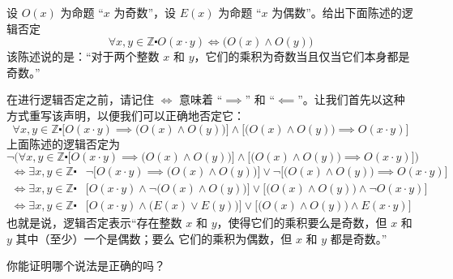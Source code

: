 \begin{example}
    设 $O(x)$ 为命题 ``$x$ 为奇数''，设 $E(x)$ 为命题 ``$x$ 为偶数''。给出下面陈述的逻辑否定
    \[\forall x, y \in \mathbb{Z} \centerdot O(x \cdot y) \iff \big(O(x) \land O(y)\big)\]
    该陈述说的是：``对于两个整数 $x$ 和 $y$，它们的乘积为奇数当且仅当它们本身都是奇数。''

    在进行逻辑否定之前，请记住 $\iff$ 意味着 ``$\implies$'' 和 ``$\impliedby$''。让我们首先以这种方式重写该声明，以便我们可以正确地否定它：
    \[\forall x, y \in \mathbb{Z} \centerdot \Big[O(x \cdot y) \implies \big(O(x) \land O(y)\big)\Big] \land \Big[\big(O(x) \land O(y)\big) \implies O(x \cdot y)\Big]\]
    上面陈述的逻辑否定为
    \[\neg \bigg(\forall x, y \in \mathbb{Z} \centerdot \Big[O(x \cdot y) \implies \big(O(x) \land O(y)\big)\Big] \land \Big[\big(O(x) \land O(y)\big) \implies O(x \cdot y)\Big]\bigg) \]
    \begin{align*}
        \iff \exists x, y \in \mathbb{Z} \centerdot & \neg \Big[O(x \cdot y) \implies \big(O(x) \land O(y)\big)\Big] \lor \neg \Big[\big(O(x) \land O(y)\big) \implies O(x \cdot y)\Big] \\
        \iff \exists x, y \in \mathbb{Z} \centerdot & \Big[O(x \cdot y) \land \neg \big(O(x) \land O(y)\big)\Big] \lor \Big[\big(O(x) \land O(y)\big) \land \neg O(x \cdot y)\Big] \\
        \iff \exists x, y \in \mathbb{Z} \centerdot & \Big[O(x \cdot y) \land \big(E(x) \lor E(y)\big)\Big] \lor \Big[\big(O(x) \land O(y)\big) \land E(x \cdot y)\Big] 
    \end{align*}
    也就是说，逻辑否定表示``存在整数 $x$ 和 $y$，使得它们的乘积要么是奇数，但 $x$ 和 $y$ 其中（至少）一个是偶数；要么 它们的乘积为偶数，但 $x$ 和 $y$ 都是奇数。''

    你能证明哪个说法是正确的吗？
\end{example}
